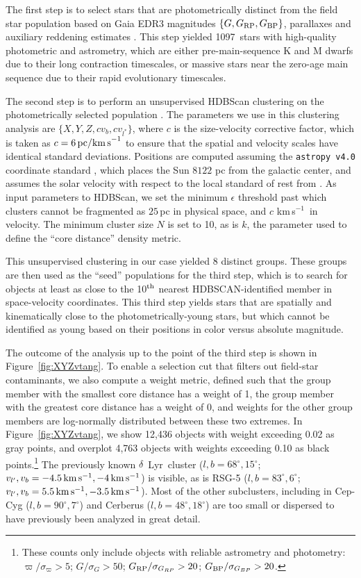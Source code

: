 \documentclass[12pt,twocolumn,linenumbers]{aastex63}
\newcommand{\npms}{1097} %
\newcommand{\kms}{\,km\,s$^{-1}$}
\newcommand{\mkms}{{\rm \,km\,s^{-1}}}  %
\begin{document}
The first step is to select stars that are photometrically distinct
from the field star population based on Gaia EDR3 magnitudes $\{G,
G_{\rm RP}, G_{\rm BP}\}$, parallaxes and auxiliary reddening
estimates \citep{lallement_gaia-2mass_2019}.  This step yielded \npms\
stars with high-quality photometric and astrometry, which are either
pre-main-sequence K and M dwarfs due to their long contraction
timescales, or massive stars near the zero-age main sequence due to
their rapid evolutionary timescales.

The second step is to perform an unsupervised HDBScan
clustering on the photometrically selected population
\citep{campello_hierarchical_2015,mcinnes_hdbscan_2017}.  The
parameters we use in this clustering analysis are $\{ X, Y, Z, c v_b,
c v_{l^*} \} $, where $c$ is the size-velocity corrective factor,
which is taken as $c=6\,{\rm pc / km\,s}^{-1}$ to ensure that the
spatial and velocity scales have identical standard deviations.
Positions are computed assuming the \texttt{astropy v4.0} coordinate
standard \citep{astropy_2018}, which places the Sun $8122$ pc from the
galactic center, and assumes the solar velocity with respect to the
local standard of rest from \citet{schonrich_local_2010}.  As input
parameters to HDBScan, we set the minimum $\epsilon$ threshold past
which clusters cannot be fragmented as $25$\,pc in physical space,
and $c$\,\kms\ in velocity.  The minimum cluster size $N$ is set to 10,
as is $k$, the parameter used to define the ``core distance'' density
metric. 

This unsupervised clustering in our case yielded 8 distinct groups.
These groups are then used as the ``seed'' populations for the third
step, which is to search for objects at least as close to the 10$^{\rm
th}$ nearest HDBSCAN-identified member in space-velocity coordinates.
This third step yields stars that are spatially and kinematically
close to the photometrically-young stars, but which cannot be
identified as young based on their positions in color versus absolute
magnitude.

The outcome of the analysis up to the point of the third step is shown
in Figure~\ref{fig:XYZvtang}.  To enable a selection cut that filters
out field-star contaminants, we also compute a weight metric, defined
such that the group member with the smallest core distance has a
weight of 1, the group member with the greatest core distance has a
weight of 0, and weights for the other group members are log-normally
distributed between these two extremes.  In Figure~\ref{fig:XYZvtang},
we show 12{,}436 objects with weight exceeding 0.02 as gray points,
and overplot 4{,}763 objects with weights exceeding 0.10 as black
points.\footnote{These counts only include objects with reliable astrometry
	and photometry: $\varpi/\sigma_\varpi>5$;
	$G/\sigma_{G}>50$;
	$G_{\rm RP}/\sigma_{G_{RP}}>20$;
	$G_{\rm BP}/\sigma_{G_{BP}}>20$.}
The previously known $\delta$~Lyr\ cluster ($l,b=68^\circ,15^\circ$;
$v_{l'}, v_b=-4.5 \mkms,-4 \mkms$) is visible, as is RSG-5
($l,b=83^\circ,6^\circ$; $v_{l'}, v_b=5.5 \mkms,-3.5 \mkms$).
Most of the other subclusters, including in Cep-Cyg
($l,b=90^\circ,7^\circ$) and Cerberus ($l,b=48^\circ,18^\circ$) are
too small or dispersed to have previously been analyzed in great
detail.
\end{document}
